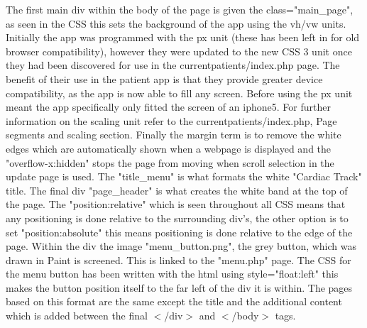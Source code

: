 \documentclass[11pt]{article}
\begin{document}
The first main div within the body of the page is given the class="main\_page", as seen in the CSS this sets the background of the app using the vh/vw units. Initially the app was programmed with the px unit (these has been left in for old browser compatibility), however they were updated to the new CSS 3 unit once they had been discovered for use in the currentpatients/index.php page. The benefit of their use in the patient app is that they provide greater device compatibility, as the app is now able to fill any screen. Before using the px unit meant the app specifically only fitted the screen of an iphone5. For further information on the scaling unit refer to the currentpatients/index.php, Page segments and scaling section. Finally the margin term is to remove the white edges which are automatically shown when a webpage is displayed and the "overflow-x:hidden" stops the page from moving when scroll selection in the update page is used. The "title\_menu" is what formats the white "Cardiac Track" title. The final div "page\_header" is what creates the white band at the top of the page. The "position:relative" which is seen throughout all CSS means that any positioning is done relative to the surrounding div's, the other option is to set "position:absolute" this means positioning is done relative to the edge of the page. Within the div the image "menu\_button.png", the grey button, which was drawn in Paint \cite{paint} is screened. This is linked to the "menu.php" page. The CSS for the menu button has been written with the html using style="float:left" this makes the button position itself to the far left of the div it is within. The pages based on this format are the same except the title and the additional content which is added between the final $<$/div$>$ and $<$/body$>$ tags. 
\end{document}
